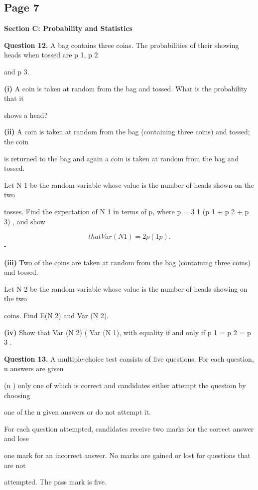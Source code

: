 \documentclass[12pt]{article}
\begin{document}
\subsection*{Page 7}
\begin{flushleft}
\bigskip\textbf{Section C: Probability and Statistics}\par
\bigskip\textbf{Question 12.} A bag contains three coins. The probabilities of their showing heads when tossed are p 1, p 2\par
and p 3.\par
\textbf{(i)} A coin is taken at random from the bag and tossed. What is the probability that it\par
shows a head?\par
\textbf{(ii)} A coin is taken at random from the bag (containing three coins) and tossed; the coin\par
is returned to the bag and again a coin is taken at random from the bag and tossed.\par
Let N 1 be the random variable whose value is the number of heads shown on the two\par
tosses. Find the expectation of N 1 in terms of p, where p = 3 1 (p 1 + p 2 + p 3) , and show\par
\[that Var (N 1) = 2p(1 p) .\]
-\par
\textbf{(iii)} Two of the coins are taken at random from the bag (containing three coins) and tossed.\par
Let N 2 be the random variable whose value is the number of heads showing on the two\par
coins. Find E(N 2) and Var (N 2).\par
\textbf{(iv)} Show that Var (N 2) ( Var (N 1), with equality if and only if p 1 = p 2 = p 3 .\par
\bigskip\textbf{Question 13.} A multiple-choice test consists of five questions. For each question, n answers are given\par
(n ) only one of which is correct and candidates either attempt the question by choosing\par
one of the n given answers or do not attempt it.\par
For each question attempted, candidates receive two marks for the correct answer and lose\par
one mark for an incorrect answer. No marks are gained or lost for questions that are not\par
attempted. The pass mark is five.\par

\end{flushleft}
\end{document}
